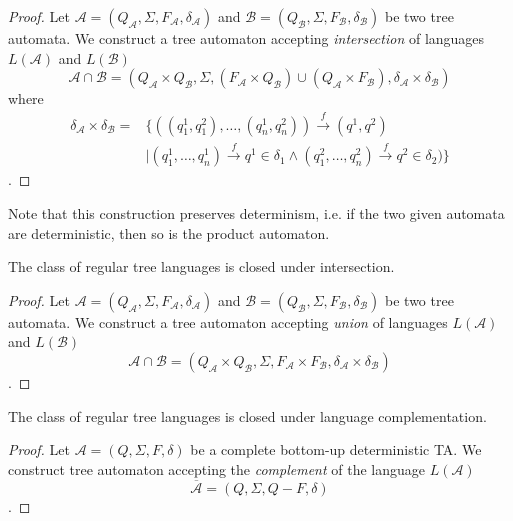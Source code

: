 \begin{proof}
Let $\mathcal{A} = (Q_\mathcal{A}, \Sigma, F_\mathcal{A}, \delta_\mathcal{A})$
and $\mathcal{B} = (Q_\mathcal{B}, \Sigma, F_\mathcal{B}, \delta_\mathcal{B})$
be two tree automata. We construct a tree automaton accepting
\emph{intersection} of languages $L(\mathcal{A})$ and $L(\mathcal{B})$  
\begin{equation}
\mathcal{A} \cap \mathcal{B}
= (Q_\mathcal{A} \times Q_\mathcal{B}, \Sigma, (F_\mathcal{A} \times
Q_\mathcal{B}) \cup (Q_\mathcal{A} \times F_\mathcal{B}), \delta_\mathcal{A}
\times \delta_\mathcal{B})
\end{equation} where
 \begin{align}
 \delta_\mathcal{A} \times \delta_\mathcal{B} = &\{
 ((q^1_1,q^2_1),\ldots,(q^1_n,q^2_n)) \overset{f}{\longrightarrow} (q^1,
 q^2)\nonumber \\
  & | (q^1_1,\ldots,q^1_n) \overset{f}{\longrightarrow} q^1 \in \delta_1
  \wedge (q^2_1,\ldots,q^2_n) \overset{f}{\longrightarrow} q^2 \in \delta_2)\}
	\end{align}.
\end{proof}

Note that this construction preserves determinism, i.e. if the two given
automata are deterministic, then so is the product automaton.

\begin{theorem}
 The class of regular tree languages is closed under intersection.
\end{theorem}

\begin{proof}
Let $\mathcal{A} = (Q_\mathcal{A}, \Sigma, F_\mathcal{A}, \delta_\mathcal{A})$
and $\mathcal{B} = (Q_\mathcal{B}, \Sigma, F_\mathcal{B}, \delta_\mathcal{B})$
be two tree automata. We construct a tree automaton accepting \emph{union}
of languages $L(\mathcal{A})$ and $L(\mathcal{B})$ 
\begin{equation}
\mathcal{A} \cap
\mathcal{B} = (Q_\mathcal{A} \times Q_\mathcal{B}, \Sigma, F_\mathcal{A} \times
F_\mathcal{B}, \delta_\mathcal{A} \times \delta_\mathcal{B})
\end{equation}.
\end{proof}

\begin{theorem}
 The class of regular tree languages is closed under language complementation.
\end{theorem}

\begin{proof}
Let $\mathcal{A} = (Q, \Sigma, F, \delta)$ be a complete bottom-up deterministic
TA. We construct tree automaton accepting the \emph{complement} of the language
$L(\mathcal{A})$ 
\begin{equation}
\overline{\mathcal{A}} = (Q, \Sigma, Q - F, \delta)
\end{equation}.
\end{proof}

